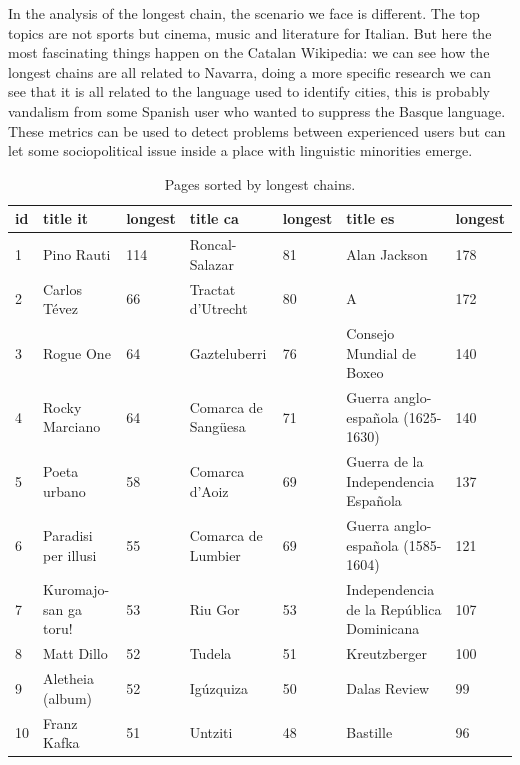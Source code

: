 In the analysis of the longest chain, the scenario we face is different. The top topics are not
sports but cinema, music and literature for Italian. But here the most fascinating things happen on
the Catalan Wikipedia: we can see how the longest chains are all related to Navarra, doing a more
specific research we can see that it is all related to the language used to identify cities, this is
probably vandalism from some Spanish user who wanted to suppress the Basque language. These metrics
can be used to detect problems between experienced users but can let some sociopolitical
issue inside a place with linguistic minorities emerge.
\begin{table}[H]
    \centering
    \begin{tabularx}{\columnwidth}{@{}Xll|ll|ll@{}}
        \midrule
        \textbf{id} & \textbf{title it} & \textbf{longest}& \textbf{title ca} & \textbf{longest} & \textbf{title es} & \textbf{longest} \\ \toprule
        1 & Pino Rauti  & 114  & Roncal-Salazar & 81 & Alan  Jackson & 178\\
        2 & Carlos Tévez & 66  & Tractat  d'Utrecht & 80 & A & 172\\
        3 & Rogue  One & 64  & Gazteluberri & 76 & Consejo  Mundial  de  Boxeo & 140\\
        4 & Rocky  Marciano & 64  &Comarca  de  Sangüesa& 71 & Guerra  anglo-española  (1625-1630) & 140\\
        5 & Poeta  urbano & 58  &Comarca  d'Aoiz & 69 & Guerra  de  la  Independencia  Española& 137\\
        6 & Paradisi  per  illusi & 55  & Comarca  de  Lumbier& 69 & Guerra  anglo-española  (1585-1604) & 121\\
        7 & Kuromajo-san  ga  toru!  & 53  &Riu  Gor & 53 & Independencia  de  la  República  Dominicana & 107\\
        8 & Matt  Dillo & 52 & Tudela & 51 & Kreutzberger & 100\\
        9 & Aletheia  (album) & 52 & Igúzquiza& 50 & Dalas  Review & 99\\
        10 & Franz  Kafka & 51  &Untziti & 48 & Bastille & 96\\


         \bottomrule
    \end{tabularx}
    
    \caption{Pages sorted by longest chains. \label{table:longestchain}}
\end{table}


